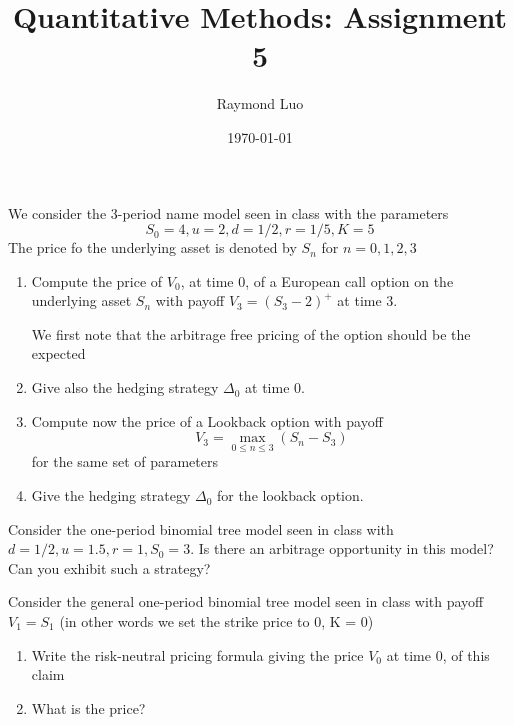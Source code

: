 \documentclass[12pt,twoside, letter]{exam}
\theoremstyle{definition}
\begin{document}
\abovedisplayskip=12pt
\belowdisplayskip=12pt
\abovedisplayshortskip=7pt
\belowdisplayshortskip=10pt
\allowdisplaybreaks

\setlength{\parindent}{18pt}

\title{Quantitative Methods: Assignment 5}
\author{Raymond Luo}
\date{\today}
\maketitle

  \par{We consider the 3-period name model seen in class with the parameters}
\begin{equation*}
  S_0 = 4, u = 2, d = 1/2, r = 1/5, K = 5
\end{equation*}
The price fo the underlying asset is denoted by $S_n$ for $n = 0,1,2,3$

\begin{enumerate}
  \item Compute the price of $V_0$, at time 0, of a European call option on the underlying asset $S_n$ with payoff
    $V_3 = (S_3 - 2)^+$ at time 3.
    \begin{solution}
      We first note that the arbitrage free pricing of the option should be the expected 
    \end{solution}
  \item Give also the hedging strategy $\Delta_0$ at time 0.
  \item Compute now the price of a Lookback option with payoff
    \begin{equation*}
      V_3  =\max_{0 \leq n \leq 3}(S_n - S_3)
    \end{equation*}
    for the same set of parameters
  \item Give the hedging strategy $\Delta_0$ for the lookback option.
\end{enumerate}

  \par{Consider the one-period binomial tree model seen in class with $d = 1/2, u = 1.5, r = 1, S_0 = 3$. Is there an arbitrage
    opportunity in this model? Can you exhibit such a strategy?}

  \par{Consider the general one-period binomial tree model seen in class with payoff $V_1 = S_1$ (in other words we set the strike price
  to 0, K = 0)}
    \begin{enumerate}
      \item Write the risk-neutral pricing formula giving the price $V_0$ at time 0, of this claim
      \item What is the price?
    \end{enumerate}
\end{document}
